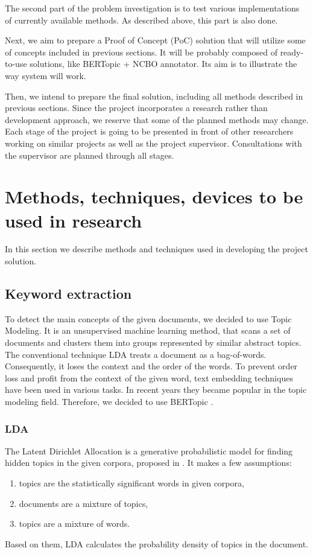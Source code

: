 \documentclass[11pt]{article}
\begin{document}
The second part of the problem investigation is to test various implementations of currently available methods. As described above, this part is also done. 

Next, we aim to prepare a Proof of Concept (PoC) solution that will utilize some of concepts included in previous sections. It will be probably composed of ready-to-use solutions, like BERTopic + NCBO annotator. Its aim is to illustrate the way system will work.

Then, we intend to prepare the final solution, including all methods described in previous sections. Since the project incorporates a research rather than development approach, we reserve that some of the planned methods may change.
Each stage of the project is going to be presented in front of other researchers working on similar projects as well as the project supervisor. Consultations with the supervisor are planned through all stages.    



\section{Methods, techniques, devices to be used in research}
In this section we describe methods and techniques used in developing the project solution.
\subsection{Keyword extraction}
To detect the main concepts of the given documents, we decided to use Topic Modeling. It is an unsupervised machine learning method, that scans a set of documents and clusters them into groups represented by similar abstract topics. The conventional technique LDA \cite{LDA} treats a document as a bag-of-words. Consequently, it loses the context and the order of the words. To prevent order loss and profit from the context of the given word, text embedding techniques have been used in various tasks. In recent years they became popular in the topic modeling field. Therefore, we decided to use BERTopic \cite{BERTopic}.

\subsubsection{LDA}
The Latent Dirichlet Allocation is a generative probabilistic model for finding hidden topics in the given corpora, proposed in \cite{LDA}. It makes a few assumptions:
\begin{enumerate}
    \item topics are the statistically significant words in given corpora,
    \item documents are a mixture of topics,
    \item topics are a mixture of words.
\end{enumerate}
Based on them, LDA calculates the probability density of topics in the document. 
\end{document}

